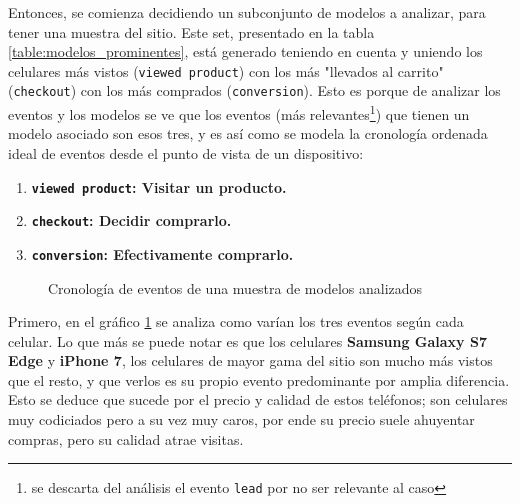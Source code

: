 \documentclass[a4paper]{article}
\begin{document}
Entonces, se comienza decidiendo un subconjunto de modelos a analizar, para tener una muestra del sitio. Este set, presentado en la tabla \ref{table:modelos_prominentes}, está generado teniendo en cuenta y uniendo los celulares más vistos (\texttt{viewed product}) con los más "llevados al carrito" (\texttt{checkout}) con los más comprados (\texttt{conversion}). Esto es porque de analizar los eventos y los modelos se ve que los eventos (más relevantes\footnote{se descarta del análisis el evento \texttt{lead} por no ser relevante al caso}) que tienen un modelo asociado son esos tres, y es así como se modela la cronología ordenada ideal de eventos desde el punto de vista de un dispositivo:

\begin{enumerate}
\item \textbf{\texttt{viewed product}: Visitar un producto.}
\item \textbf{\texttt{checkout}: Decidir comprarlo.}
\item \textbf{\texttt{conversion}: Efectivamente comprarlo.}
\end{enumerate}

\begin{figure}[h!]
	\caption{Cronología de eventos de una muestra de modelos analizados}
	\label{fig:prominentes}
\end{figure}

Primero, en el gráfico \ref{fig:prominentes} se analiza como varían los tres eventos según cada celular. Lo que más se puede notar es que los celulares \textbf{Samsung Galaxy S7 Edge} y \textbf{iPhone 7}, los celulares de mayor gama del sitio son mucho más vistos que el resto, y que verlos es su propio evento predominante por amplia diferencia. Esto se deduce que sucede por el precio y calidad de estos teléfonos; son celulares muy codiciados pero a su vez muy caros, por ende su precio suele ahuyentar compras, pero su calidad atrae visitas.
\end{document}
